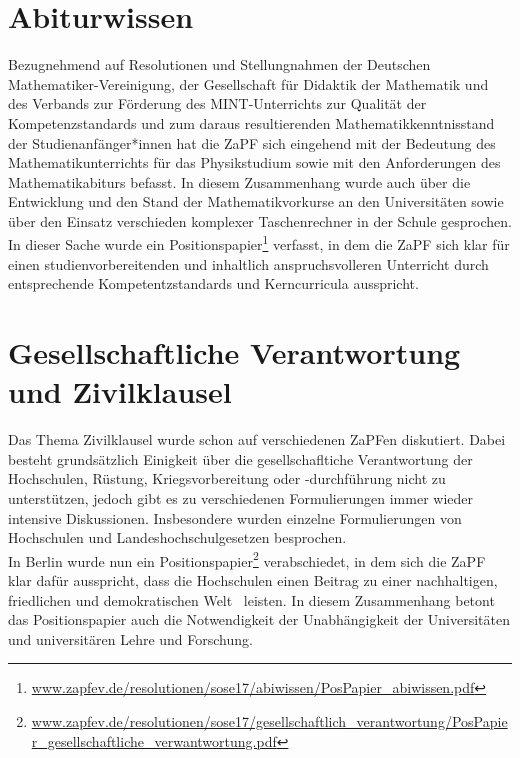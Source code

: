 \documentclass[a4paper]{article}
\begin{document}
\section*{Abiturwissen}
Bezugnehmend auf Resolutionen und Stellungnahmen der Deutschen Mathematiker-Vereinigung, der Gesellschaft für Didaktik der Mathematik und des Verbands zur Förderung des MINT-Unterrichts zur Qualität der Kompetenzstandards und zum daraus resultierenden Mathematikkenntnisstand der Studienanfänger*innen hat die ZaPF sich eingehend mit der Bedeutung des Mathematikunterrichts für das Physikstudium sowie mit den Anforderungen des Mathematikabiturs befasst. In diesem Zusammenhang wurde auch über die Entwicklung und den Stand der Mathematikvorkurse an den Universitäten sowie über den Einsatz verschieden komplexer Taschenrechner in der Schule gesprochen. In dieser Sache wurde ein Positionspapier\footnote{\href{https://zapfev.de/resolutionen/sose17/abiwissen/PosPapier_abiwissen.pdf}{\url{www.zapfev.de/resolutionen/sose17/abiwissen/PosPapier_abiwissen.pdf}}}
verfasst, in dem die ZaPF sich klar für einen studienvorbereitenden und inhaltlich anspruchsvolleren Unterricht durch entsprechende Kompetentzstandards und Kerncurricula ausspricht.


\section*{Gesellschaftliche Verantwortung und Zivilklausel} 
Das Thema Zivilklausel wurde schon auf verschiedenen ZaPFen diskutiert. 
Dabei besteht grundsätzlich Einigkeit über die gesellschafltiche Verantwortung der Hochschulen, Rüstung, Kriegsvorbereitung oder -durchführung nicht zu unterstützen, jedoch gibt es zu verschiedenen Formulierungen immer wieder intensive Diskussionen. Insbesondere wurden einzelne Formulierungen von Hochschulen und Landeshochschulgesetzen besprochen.\\
 In Berlin wurde nun ein Positionspapier\footnote{\href{https://zapfev.de/resolutionen/sose17/gesellschaftlich_verantwortung/PosPapier_gesellschaftliche_verwantwortung.pdf} {\url{www.zapfev.de/resolutionen/sose17/gesellschaftlich_verantwortung/PosPapier_gesellschaftliche_verwantwortung.pdf}}} 
verabschiedet, in dem sich die ZaPF klar dafür ausspricht, \glqq dass die Hochschulen einen Beitrag zu einer nachhaltigen, friedlichen und demokratischen Welt \grqq~leisten. In diesem Zusammenhang betont das Positionspapier auch die Notwendigkeit der Unabhängigkeit der Universitäten und universitären Lehre und Forschung.
\end{document}
